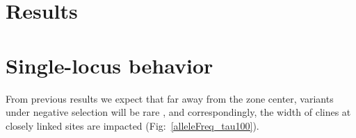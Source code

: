 \documentclass[12pt]{article}
\begin{document}

\section*{Results}

\section*{Single-locus behavior}

From previous results we expect that far away from the zone center, variants under negative selection will be rare \citep[for demonstration of this theoretical result, see e.g.][]{May1975,Slatkin1973,Barton??}, and correspondingly, the width of clines at closely linked sites are impacted (Fig:~\ref{alleleFreq_tau100}). 
\end{document}
